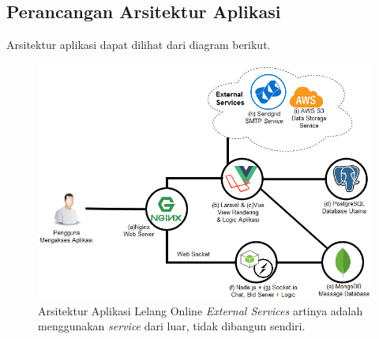 
\subsection{Perancangan Arsitektur Aplikasi}

	Arsitektur aplikasi dapat dilihat dari diagram berikut.
      \begin{figure}[H]
        \centering
        \includegraphics[width=\textwidth]{images/bab3/arsitektur-app.png}
        \caption{Arsitektur Aplikasi Lelang Online 
        		\newline
                \textit{External Services} artinya adalah menggunakan \textit{service} dari luar, tidak dibangun sendiri.}
        \label{arsitektur-app}
      \end{figure}
      
    \pagebreak
    
